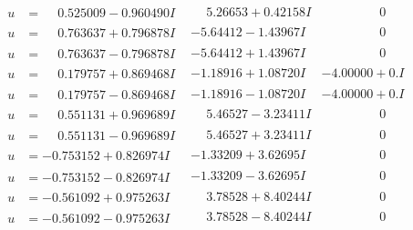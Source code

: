 \documentclass[1p]{elsarticle_modified}
\theoremstyle{definition}
\begin{document}
$$\begin{array}{c|c|c}
\begin{aligned}
u &= \phantom{-}0.525009 - 0.960490 I\end{aligned}
 & \phantom{-}5.26653 + 0.42158 I & \phantom{-0.000000 } 0 \\ \hline\begin{aligned}
u &= \phantom{-}0.763637 + 0.796878 I\end{aligned}
 & -5.64412 - 1.43967 I & \phantom{-0.000000 } 0 \\ \hline\begin{aligned}
u &= \phantom{-}0.763637 - 0.796878 I\end{aligned}
 & -5.64412 + 1.43967 I & \phantom{-0.000000 } 0 \\ \hline\begin{aligned}
u &= \phantom{-}0.179757 + 0.869468 I\end{aligned}
 & -1.18916 + 1.08720 I & -4.00000 + 0. I\phantom{ +0.000000I} \\ \hline\begin{aligned}
u &= \phantom{-}0.179757 - 0.869468 I\end{aligned}
 & -1.18916 - 1.08720 I & -4.00000 + 0. I\phantom{ +0.000000I} \\ \hline\begin{aligned}
u &= \phantom{-}0.551131 + 0.969689 I\end{aligned}
 & \phantom{-}5.46527 - 3.23411 I & \phantom{-0.000000 } 0 \\ \hline\begin{aligned}
u &= \phantom{-}0.551131 - 0.969689 I\end{aligned}
 & \phantom{-}5.46527 + 3.23411 I & \phantom{-0.000000 } 0 \\ \hline\begin{aligned}
u &= -0.753152 + 0.826974 I\end{aligned}
 & -1.33209 + 3.62695 I & \phantom{-0.000000 } 0 \\ \hline\begin{aligned}
u &= -0.753152 - 0.826974 I\end{aligned}
 & -1.33209 - 3.62695 I & \phantom{-0.000000 } 0 \\ \hline\begin{aligned}
u &= -0.561092 + 0.975263 I\end{aligned}
 & \phantom{-}3.78528 + 8.40244 I & \phantom{-0.000000 } 0 \\ \hline\begin{aligned}
u &= -0.561092 - 0.975263 I\end{aligned}
 & \phantom{-}3.78528 - 8.40244 I & \phantom{-0.000000 } 0 \\ \hline\begin{aligned}

\end{aligned}
\end{array}$$
\end{document}
